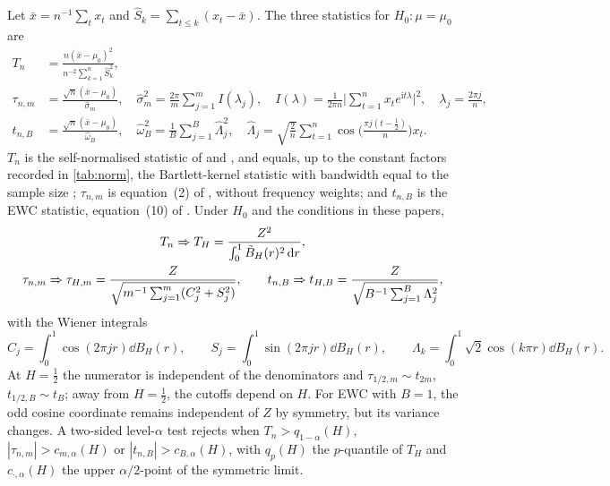 Let $\bar x=n^{-1}\sum_tx_t$ and $\hat S_k=\sum_{t\le k}(x_t-\bar x)$. The three statistics for $H_0:\mu=\mu_0$ are
\begin{align}
T_n&=\frac{n(\bar x-\mu_0)^2}{n^{-2}\sum_{k=1}^n\hat S_k^2}, \label{eq:Tn}\\
\tau_{n,m}&=\frac{\sqrt n(\bar x-\mu_0)}{\hat\sigma_m},\quad
\hat\sigma_m^2=\frac{2\pi}m\sum_{j=1}^mI(\lambda_j),\quad I(\lambda)=\frac1{2\pi n}\Big|\sum_{t=1}^nx_te^{\mathrm it\lambda}\Big|^2,
\quad\lambda_j=\frac{2\pi j}n, \label{eq:tauHI}\\
t_{n,B}&=\frac{\sqrt n(\bar x-\mu_0)}{\hat\omega_B},\quad
\hat\omega_B^2=\frac1B\sum_{j=1}^B\hat\Lambda_j^2,\quad
\hat\Lambda_j=\sqrt{\frac2n}\sum_{t=1}^n\cos\Big(\frac{\pi j(t-\frac12)}n\Big)x_t. \label{eq:tEWC}
\end{align}
$T_n$ is the self-normalised statistic of \citet{Lob01} and \citet{Sha10}, and equals, up to the constant factors
recorded in \cref{tab:norm}, the Bartlett-kernel statistic with bandwidth equal to the sample size \citep{KVB00,KV02,MP12};
$\tau_{n,m}$ is equation~(2) of \citet{HI17}, without frequency weights; and $t_{n,B}$ is the EWC statistic, equation~(10)
of \citet{LLSW18}. Under $H_0$ and the conditions in these papers,
\begin{equation}\label{eq:limits}
\begin{gathered}
T_n\Rightarrow T_H=\frac{Z^2}{\int_0^1\tilde B_H(r)^2\,\mathrm d r},\\
\tau_{n,m}\Rightarrow\tau_{H,m}=\frac{Z}{\sqrt{m^{-1}\sum_{j=1}^m(C_j^2+S_j^2)}},\qquad
t_{n,B}\Rightarrow t_{H,B}=\frac{Z}{\sqrt{B^{-1}\sum_{j=1}^B\Lambda_j^2}},
\end{gathered}
\end{equation}
with the Wiener integrals
\[C_j=\int_0^1\cos(2\pi jr)\dd B_H(r),\qquad S_j=\int_0^1\sin(2\pi jr)\dd B_H(r),\qquad
\Lambda_k=\int_0^1\sqrt2\cos(k\pi r)\dd B_H(r).\]
At $H=\frac12$ the numerator is independent of the denominators and
$\tau_{1/2,m}\sim t_{2m}$, $t_{1/2,B}\sim t_B$; away from $H=\frac12$, the cutoffs depend on $H$. For EWC with $B=1$, the odd cosine coordinate remains independent of $Z$ by symmetry, but its variance changes. A two-sided level-$\alpha$ test rejects
when $T_n>q_{1-\alpha}(H)$, $|\tau_{n,m}|>c_{m,\alpha}(H)$ or $|t_{n,B}|>c_{B,\alpha}(H)$, with $q_p(H)$ the $p$-quantile of
$T_H$ and $c_{\cdot,\alpha}(H)$ the upper $\alpha/2$-point of the symmetric limit.

